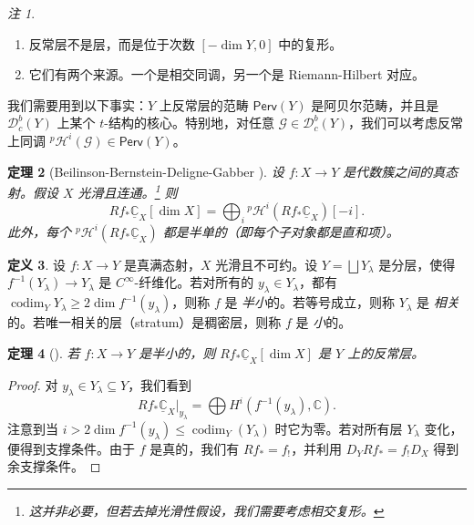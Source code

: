 \documentclass{amsart}
\newtheorem{thm}{定理}[section]
\theoremstyle{definition}
\newtheorem{defn}[thm]{定义}
\theoremstyle{remark}
\newtheorem{rmks}[thm]{注}
\theoremstyle{plain}
\theoremstyle{definition}
\theoremstyle{remark}
\newcommand{\C}{\mathbb{C}}
\newcommand{\mc}[1]{\mathcal{#1}}
\newcommand{\on}[1]{\operatorname{#1}}
\newcommand{\ms}[1]{\mathsf{#1}}
\newcommand{\ul}[1]{\underline{#1}}
\newcommand{\1}{\mathbf{1}}
\newcommand{\2}{\mathbf{2}}
\newcommand{\3}{\mathbf{3}}
\begin{document}
\begin{rmks}\leavevmode
    \begin{enumerate}
        \item 反常层不是层，而是位于次数 \([-\dim Y, 0]\) 中的复形。
        \item 它们有两个来源。一个是相交同调，另一个是 Riemann-Hilbert 对应。
    \end{enumerate}
\end{rmks}

我们需要用到以下事实：\(Y\) 上反常层的范畴 \(\ms{Perv}(Y)\) 是阿贝尔范畴，并且是 \(\mc{D}_c^b(Y)\) 上某个 \(t\)-结构的核心。特别地，对任意 \(\mc{G} \in \mc{D}_c^b (Y)\)，我们可以考虑反常上同调 \(^p\mc{H}^i(\mc{G}) \in \ms{Perv}(Y)\)。

\begin{thm}[Beilinson-Bernstein-Deligne-Gabber {\cite{BBD1982}}]
    设 \(f \colon X \to Y\) 是代数簇之间的真态射。假设 \(X\) 光滑且连通。\footnote{这并非必要，但若去掉光滑性假设，我们需要考虑相交复形。} 则
    \[ R f_* \ul{\C}_X [\dim X] = \bigoplus_{i} {^p\mc{H}^i}(R f_* \ul{\C}_X)[-i]. \]
    此外，每个 \(^p\mc{H}^i (R f_* \ul{\C}_X)\) 都是半单的（即每个子对象都是直和项）。
\end{thm}

\begin{defn}
    设 \(f \colon X \to Y\) 是真满态射，\(X\) 光滑且不可约。设 \(Y = \bigsqcup Y_{\lambda}\) 是分层，使得 \(f^{-1}(Y_{\lambda}) \to Y_{\lambda}\) 是 \(C^{\infty}\)-纤维化。若对所有的 \(y_{\lambda} \in Y_{\lambda}\)，都有 \(\on{codim}_Y Y_{\lambda} \geq 2 \dim f^{-1} (y_{\lambda})\)，则称 \(f\) 是 \textit{半小}的。若等号成立，则称 \(Y_{\lambda}\) 是 \textit{相关}的。若唯一相关的层（stratum）是稠密层，则称 \(f\) 是 \textit{小}的。
\end{defn}

\begin{thm}[{\cite{DeCataldoMigliorini2002}}]
    若 \(f \colon X \to Y\) 是半小的，则 \(R f_* \ul{\C}_X [\dim X]\) 是 \(Y\) 上的反常层。
\end{thm}

\begin{proof}
    对 \(y_{\lambda} \in Y_{\lambda} \subseteq Y\)，我们看到
    \[ R f_* \ul{\C}_X |_{y_{\lambda}} = \bigoplus H^i (f^{-1}(y_{\lambda}), \C). \]
    注意到当 \(i > 2 \dim f^{-1}(y_{\lambda}) \leq \on{codim}_Y (Y_{\lambda})\) 时它为零。若对所有层 \(Y_{\lambda}\) 变化，便得到支撑条件。由于 \(f\) 是真的，我们有 \(R f_* = f_!\)，并利用 \(D_Y R f_* = f_! D_X\) 得到余支撑条件。
\end{proof}
\end{document}

